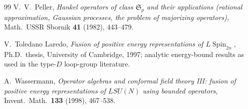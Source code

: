\begin{thebibliography}{99}
V.~V.~Peller,
\emph{Hankel operators of class $\mathfrak S_p$ and their applications
(rational approximation, Gaussian processes, the problem of majorizing
operators)},
Math.\ USSR Sbornik \textbf{41} (1982), 443--479.

V.~Toledano Laredo,
\emph{Fusion of positive energy representations of $L\operatorname{Spin}_{2n}$},
Ph.D.\ thesis, University of Cambridge, 1997; analytic energy-bound
results as used in the type-$D$ loop-group literature.

A.~Wassermann,
\emph{Operator algebras and conformal field theory III: fusion of
positive energy representations of $LSU(N)$ using bounded operators},
Invent.\ Math.\ \textbf{133} (1998), 467--538.

\end{thebibliography}


